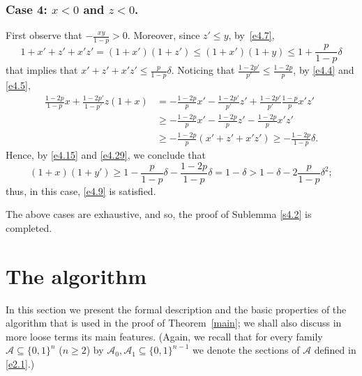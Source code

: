 \documentclass[10pt,a4paper]{amsart}
\theoremstyle{remark}
\newcommand{\meg}{\geqslant}
\newcommand{\mik}{\leqslant}
\newcommand{\Acal}{\mathcal{A}}
\begin{document}
\subsubsection*{Case 4: $x<0$ and $z<0$.} First observe that $-\frac{xy}{1-p}>0$.
Moreover, since $z'\mik y$, by~\eqref{e4.7},
\begin{equation} \label{e4.28}
1+x'+z'+x'z'=(1+x')(1+z') \mik (1+x')(1+y) \mik 1+\frac{p}{1-p}\delta
\end{equation}
that implies that $x'+z'+x'z'\mik \frac{p}{1-p}\delta$. Noticing that $\frac{1-2p'}{p'}\mik \frac{1-2p}{p}$,
by \eqref{e4.4} and \eqref{e4.5},
\begin{align}
\label{e4.29} \frac{1-2p}{1-p}x+\frac{1-2p'}{1-p'}z(1+x) & =
-\frac{1-2p}{p}x'-\frac{1-2p'}{p'}z'+\frac{1-2p'}{p'}\frac{1-p}{p}x'z' \\
& \meg -\frac{1-2p}{p}x'-\frac{1-2p}{p}z'-\frac{1-2p}{p}x'z' \nonumber \\
& \meg -\frac{1-2p}{p}(x'+z'+x'z')\meg  -\frac{1-2p}{1-p}\delta. \nonumber
\end{align}
Hence, by \eqref{e4.15} and \eqref{e4.29}, we conclude that
\begin{equation} \label{e4.30}
(1+x)(1+y')\meg 1-\frac{p}{1-p}\delta-\frac{1-2p}{1-p}\delta=
1-\delta>1-\delta-2\frac{p}{1-p}\delta^2;
\end{equation}
thus, in this case, \eqref{e4.9} is satisfied.
\medskip

The above cases are exhaustive, and so, the proof of Sublemma \ref{s4.2} is completed.


\section{The algorithm} \label{sec5}


In this section we present the formal description and the basic properties of
the algorithm that is used in the proof of Theorem~\ref{main}; we shall also discuss in more
loose terms its main features. (Again, we recall that for every family
$\mathcal{A}\subseteq \{0,1\}^n$ ($n\meg 2$) by $\mathcal{A}_0,\mathcal{A}_1\subseteq \{0,1\}^{n-1}$
we denote the sections of $\Acal$ defined in \eqref{e2.1}.)
\end{document}
